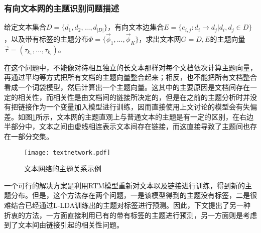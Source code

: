 \subsubsection{有向文本网的主题识别问题描述}

\begin{mydef}[有向文本网的主题识别问题]
  给定文本集合$D=\{d_1,d_2,...,d_{|D|}\}$，有向文本边集合$E=\{e_{i,j}:d_i\rightarrow d_j|d_i,d_j\in D\}$，以及带有标签的主题分布$\Phi=\{\vec{\phi}_1,...,\vec{\phi}_K\}$，求出文本网$G={D,E}$的主题向量$\vec{\tau}=(\tau_{k_1},...,\tau_{k_l})$。
\end{mydef}

在这个问题中，不能像对待相互独立的长文本那样对每个文档依次计算主题向量，再通过平均等方式把所有文档的主题向量整合起来；相反，也不能把所有文档整合看成一个词袋模型，然后计算出一个主题向量。这其中的主要原因是文档间存在一定的相关性，而相关性是由文档间的链接所决定的，但是在之前的主题分析时并没有把链接作为一个变量加入模型进行训练，因而直接使用上文讨论的模型会有失偏差。如图\ref{fig:textnetwork}所示，文本网的主题直观上与普通文本的主题是有一定的区别，在右边半部分中，文本之间由虚线相连表示文本间存在链接，而这直接导致了主题间也存在一部分交集。

\begin{figure}
\centering
\texttt{[image: textnetwork.pdf]}
\caption{文本网络的主题关系示例}
\label{fig:textnetwork}
\end{figure}

一个可行的解决方案是利用RTM\cite{chang2009relational}模型重新对文本以及链接进行训练，得到新的主题分布。但是，这个方法存在两个问题，一是该模型得到的主题没有标签，二是很难结合已经通过L-LDA训练出的主题对标签进行预测。因此，下文提出了另一种折衷的方法，一方面直接利用已有的带有标签的主题进行预测，另一方面则是考虑到了文本间由链接引起的相关性问题。

